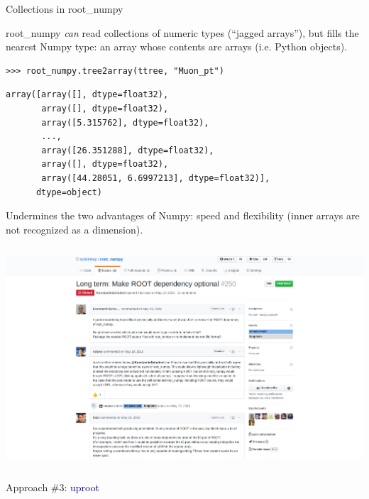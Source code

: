 \documentclass[aspectratio=169]{beamer}
\begin{document}
\begin{frame}[fragile]{Collections in root\_numpy}
\large
\vspace{0.5 cm}

root\_numpy {\it can} read collections of numeric types (``jagged arrays''), but fills the nearest Numpy type: an array whose contents are arrays (i.e. Python objects).

\small
\begin{verbatim}
>>> root_numpy.tree2array(ttree, "Muon_pt")
\end{verbatim}
\color{darkblue}\vspace{-\baselineskip}\begin{verbatim}
array([array([], dtype=float32),
       array([], dtype=float32),
       array([5.315762], dtype=float32),
       ...,
       array([26.351288], dtype=float32),
       array([], dtype=float32),
       array([44.28051, 6.6997213], dtype=float32)],
      dtype=object)
\end{verbatim}
\color{black}

\large
Undermines the two advantages of Numpy: speed and flexibility (inner arrays are not recognized as a dimension).
\end{frame}

\begin{frame}{}
\begin{columns}
\includegraphics[width=\linewidth]{root-numpy-optionalroot.png}
\end{columns}
\end{frame}

\begin{frame}{}
\LARGE
\begin{center}
Approach \#3: \textcolor{darkblue}{uproot}
\end{center}
\end{frame}
\end{document}
